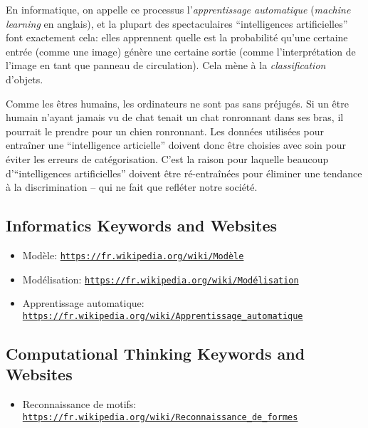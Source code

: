 \documentclass[a4paper,11pt]{report}
\newcommand{\BrochureUrlText}[1]{\texttt{#1}}
\begin{document}
En informatique, on appelle ce processus l’\emph{apprentissage automatique} (\emph{machine learning} en anglais), et la plupart des spectaculaires “intelligences artificielles” font exactement cela: elles apprennent quelle est la probabilité qu’une certaine entrée (comme une image) génère une certaine sortie (comme l’interprétation de l’image en tant que panneau de circulation). Cela mène à la \emph{classification} d’objets.

Comme les êtres humains, les ordinateurs ne sont pas sans préjugés. Si un être humain n’ayant jamais vu de chat tenait un chat ronronnant dans ses bras, il pourrait le prendre pour un chien ronronnant. Les données utilisées pour entraîner une “intelligence articielle” doivent donc être choisies avec soin pour éviter les erreurs de catégorisation. C’est la raison pour laquelle beaucoup d’“intelligences artificielles” doivent être ré-entraînées pour éliminer une tendance à la discrimination – qui ne fait que refléter notre société.


\subsection*{Informatics Keywords and Websites}

\begin{itemize}
  \item Modèle: \href{https://fr.wikipedia.org/wiki/Mod\%C3\%A8le}{\BrochureUrlText{https://fr.wikipedia.org/wiki/Modèle}}
  \item Modélisation: \href{https://fr.wikipedia.org/wiki/Mod\%C3\%A9lisation}{\BrochureUrlText{https://fr.wikipedia.org/wiki/Modélisation}}
  \item Apprentissage automatique: \href{https://fr.wikipedia.org/wiki/Apprentissage_automatique}{\BrochureUrlText{https://fr.wikipedia.org/wiki/Apprentissage\_automatique}}
\end{itemize}


\subsection*{Computational Thinking Keywords and Websites}

\begin{itemize}
  \item Reconnaissance de motifs: \href{https://fr.wikipedia.org/wiki/Reconnaissance_de_formes}{\BrochureUrlText{https://fr.wikipedia.org/wiki/Reconnaissance\_de\_formes}}
\end{itemize}
\end{document}
